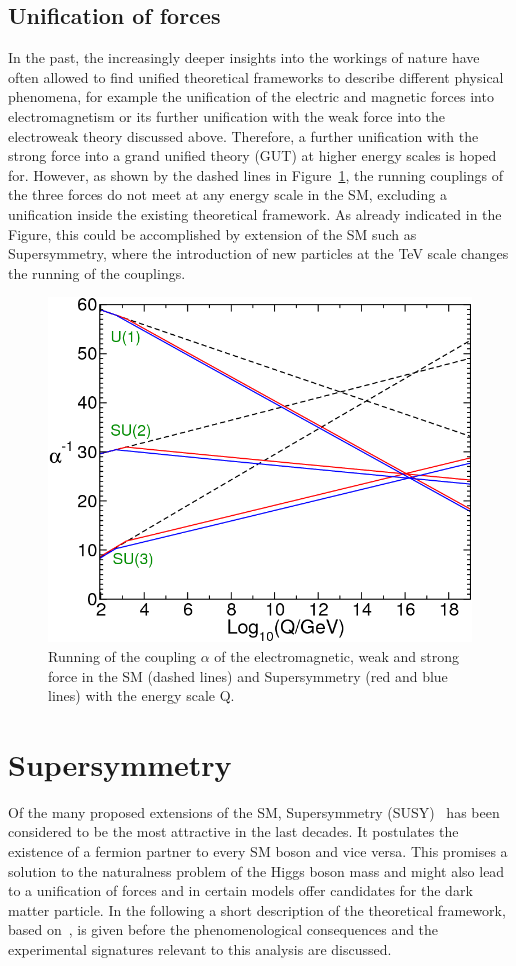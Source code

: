 \subsection*{Unification of forces}
In the past, the increasingly deeper insights into the workings of nature have often allowed to find unified theoretical frameworks to describe different physical phenomena, for example the unification of the electric and magnetic forces into electromagnetism or its further unification with the weak force into the electroweak theory discussed above. Therefore, a further unification with the strong force into a grand unified theory (GUT) at higher energy scales is hoped for. However, as shown by the dashed lines in Figure~\ref{fit:unification}, the running couplings of the three forces do not meet at any energy scale in the SM, excluding a unification inside the existing theoretical framework. As already indicated in the Figure, this could be accomplished by extension of the SM such as Supersymmetry, where the introduction of new particles at the TeV scale changes the running of the couplings.
\begin{figure}
\centering
\includegraphics[scale=0.35]{plots/THEO/unification.png}
\caption{Running of the coupling $\alpha$ of the electromagnetic, weak and strong force in the SM (dashed lines) and Supersymmetry (red and blue lines)\cite{Martin:1997ns} with the energy scale Q.}
\label{fit:unification}
\end{figure}
\section{Supersymmetry}
Of the many proposed extensions of the SM, Supersymmetry (SUSY)~\cite{Wess197439} has been considered to be the most attractive in the last decades. It postulates the existence of a fermion partner to every SM boson and vice versa. This promises a solution to the naturalness problem of the Higgs boson mass and might also lead to a unification of forces and in certain models offer candidates for the dark matter particle. In the following a short description of the theoretical framework, based on~\cite{Martin:1997ns}, is given before the phenomenological consequences and the experimental signatures relevant to this analysis are discussed.
